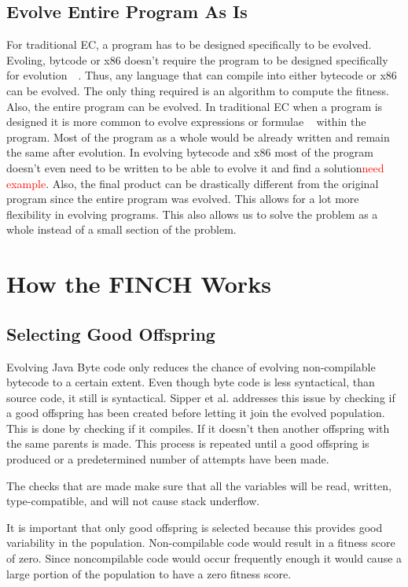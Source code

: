\documentclass{sig-alternate}
\newcommand{\mycomment}[1]{\textcolor{red}{#1}}
\begin{document}
\subsection{Evolve Entire Program As Is}
For traditional EC, a program has to be designed specifically to be evolved. Evoling, bytcode or x86 doesn't require the program to be designed specifically for evolution~\cite{Assembly:2010}~\cite{FINCH:2011}. Thus, any language that can compile into either bytecode or x86 can be evolved. The only thing required is an algorithm to compute the fitness. Also, the entire program can be evolved. In traditional EC when a program is designed it is more common to evolve expressions or formulae ~\cite{FINCH:2011} within the program. Most of the program as a whole would be already written and remain the same after evolution. In evolving bytecode and x86 most of the program doesn't even need to be written to be able to evolve it and find a solution\mycomment{need example}. Also, the final product can be drastically different from the original program since the entire program was evolved. This allows for a lot more flexibility in evolving programs. This also allows us to solve the problem as a whole instead of a small section of the problem.


\section{How the FINCH Works}

\subsection{Selecting Good Offspring}
Evolving Java Byte code only reduces the chance of evolving non-compilable bytecode to a certain extent. Even though byte code is less syntactical, than source code, it still is syntactical. Sipper et al.\cite{FINCH2:2009} addresses this issue by checking if a good offspring has been created before letting it join the evolved population. This is done by checking if it compiles. If it doesn't then another offspring with the same parents is made. This process is repeated until a good offspring is produced or a predetermined number of attempts have been made.\par
The checks that are made make sure that all the variables will be read, written, type-compatible, and will not cause stack underflow\cite{VIII:2011}.\par
It is important that only good offspring is selected because this provides good variability in the population. Non-compilable code would result in a fitness score of zero. Since noncompilable code would occur frequently enough it would cause a large portion of the population to have a zero fitness score.
\end{document}
